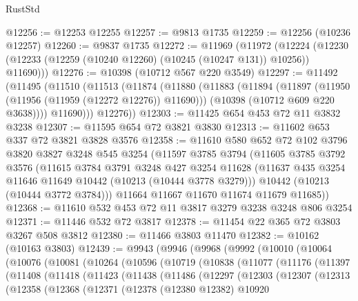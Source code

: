 \begin{lexlean}{RustStd}
\begin{coremodule}
@12256 := @12253 @12255
@12257 := @9813 @1735
@12259 := @12256 (@10236 @12257)
@12260 := @9837 @1735
@12272 := @11969
    (@11972
      (@12224 (@12230 (@12233 (@12259 (@10240 @12260) (@10245 (@10247 @131)) @10256)) @11690)))
@12276 := @10398 (@10712 @567 @220 @3549)
@12297 := @11492
    (@11495
      (@11510
        (@11513
          (@11874
            (@11880
              (@11883
                (@11894
                  (@11897 (@11950 (@11956 (@11959 (@12272 @12276)) @11690)))
                  (@10398 (@10712 @609 @220 @3638))))
              @11690)))
        @12276))
@12303 := @11425 @654 @453 @72 @11 @3832 @3238
@12307 := @11595 @654 @72 @3821 @3830
@12313 := @11602 @653 @337 @72 @3821 @3828 @3576
@12358 := @11610
    @580
    @652
    @72
    @102
    @3796
    @3820
    @3827
    @3248
    @545
    @3254
    (@11597
      @3785
      @3794
      (@11605
        @3785
        @3792
        @3576
        (@11615
          @3784
          @3791
          @3248
          @427
          @3254
          @11628
          (@11637 @435 @3254 @11646 @11649 @10442 (@10213 (@10444 @3778 @3279)))
          @10442
          (@10213 (@10444 @3772 @3784)))
        @11664
        @11667
        @11670
        @11674
        @11679
        @11685))
@12368 := @11610 @532 @453 @72 @11 @3817 @3279 @3238 @3248 @806 @3254
@12371 := @11446 @532 @72 @3817
@12378 := @11454 @22 @365 @72 @3803 @3267 @508 @3812
@12380 := @11466 @3803 @11470
@12382 := @10162 (@10163 @3803)
@12439 := @9943
    (@9946
      (@9968
        (@9992
          (@10010
            (@10064
              (@10076
                (@10081
                  (@10264
                    (@10596
                      (@10719
                        (@10838
                          (@11077
                            (@11176
                              (@11397
                                (@11408
                                  (@11418
                                    (@11423
                                      (@11438
                                        (@11486
                                          (@12297
                                            (@12303
                                              (@12307
                                                (@12313
                                                  (@12358
                                                    (@12368
                                                      (@12371
                                                        (@12378
                                                          (@12380 @12382)
                                                          @10920

\end{coremodule}
\end{lexlean}
